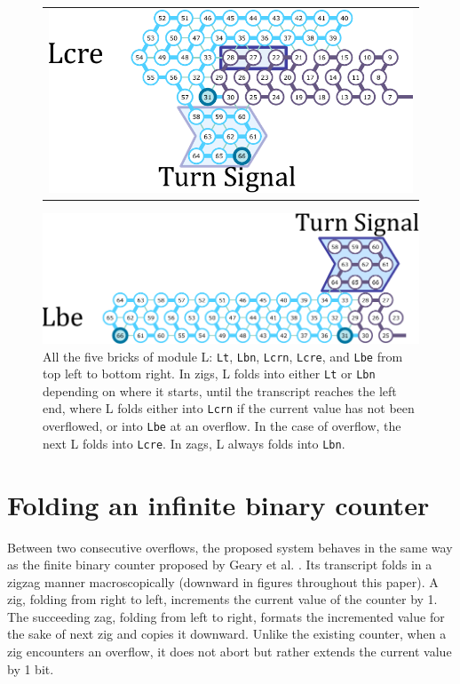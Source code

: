\documentclass[twocolumn]{svjour3}
\begin{document}
\begin{figure}[tb]
\begin{tabular}{c}
  \begin{minipage}{0.5\linewidth}
  \centering
   \includegraphics[width=\linewidth]{fig/svg/Ltre_3.pdf}
 \end{minipage}
 \end{tabular}

  \centering
   \includegraphics[width=0.5\linewidth]{fig/svg/Lbe_3.pdf}


 
 \caption{All the five bricks of module L: \texttt{Lt}, \texttt{Lbn}, \texttt{Lcrn}, \texttt{Lcre}, and \texttt{Lbe} from top left to bottom right.
In zigs, L folds into either \texttt{Lt} or \texttt{Lbn} depending on where it starts, until the transcript reaches the left end, where L folds either into \texttt{Lcrn} if the current value has not been overflowed, or into \texttt{Lbe} at an overflow.
In the case of overflow, the next L folds into \texttt{Lcre}.
In zags, L always folds into \texttt{Lbn}.}
 \label{fig:leftturns}
\end{figure}

\section{Folding an infinite binary counter}


Between two consecutive overflows, the proposed system behaves in the same way as the finite binary counter proposed by Geary et al. \cite{GeMeScSe2019}.
Its transcript folds in a zigzag manner macroscopically (downward in figures throughout this paper).
A zig, folding from right to left, increments the current value of the counter by 1.
The succeeding zag, folding from left to right, formats the incremented value for the sake of next zig and copies it downward.
Unlike the existing counter, when a zig encounters an overflow, it does not abort but rather extends the current value by 1 bit.
\end{document}
